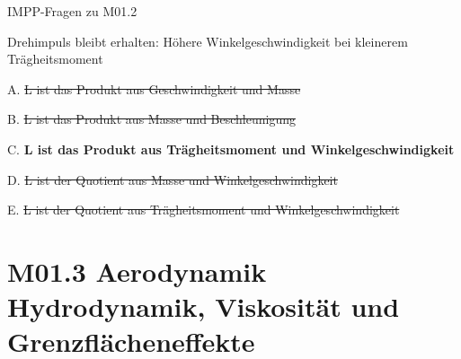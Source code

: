 \documentclass{beamer}
\begin{document}
\begin{frame}{IMPP-Fragen zu M01.2}

Drehimpuls bleibt erhalten: Höhere Winkelgeschwindigkeit bei kleinerem Trägheitsmoment

\pause

\begin{description}
\item{A.} \sout{L ist das Produkt aus Geschwindigkeit und Masse}
\item{B.} \sout{L ist das Produkt aus Masse und Beschleunigung}
\item{C.} \textcolor{theme}{\textbf{L ist das Produkt aus Trägheitsmoment und Winkelgeschwindigkeit}} %
\item{D.} \sout{L ist der Quotient aus Masse und Winkelgeschwindigkeit}
\item{E.}  \sout{L ist der Quotient aus Trägheitsmoment und Winkelgeschwindigkeit}
\end{description}

\end{frame}
    


   



\section{M01.3 Aerodynamik Hydrodynamik, Viskosität und Grenzflächeneffekte}




\end{document}

